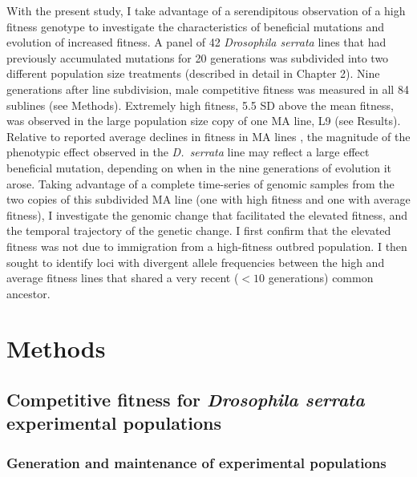 With the present study, I take advantage of a serendipitous observation of a high fitness genotype to investigate the characteristics of beneficial mutations and evolution of increased fitness. A panel of 42 \textit{Drosophila serrata} lines that had previously accumulated mutations for 20 generations was subdivided into two different population size treatments (described in detail in Chapter 2). Nine generations after line subdivision, male competitive fitness was measured in all 84 sublines (see Methods). Extremely high fitness, 5.5 SD above the mean fitness, was observed in the large population size copy of one MA line, L9 (see Results). Relative to reported average declines in fitness in MA lines \citep[0.36\% per generation,][]{Hall09}, the magnitude of the phenotypic effect observed in the \textit{D.~serrata} line may reflect a large effect beneficial mutation, depending on when in the nine generations of evolution it arose. Taking advantage of a complete time-series of genomic samples from the two copies of this subdivided MA line (one with high fitness and one with average fitness), I investigate the genomic change that facilitated the elevated fitness, and the temporal trajectory of the genetic change. I first confirm that the elevated fitness was not due to immigration from a high-fitness outbred population. I then sought to identify loci with divergent allele frequencies between the high and average fitness lines that shared a very recent ($<10$ generations) common ancestor.\par


\section{Methods}
\subsection{Competitive fitness for \textit{Drosophila serrata} experimental populations}
\subsubsection{Generation and maintenance of experimental populations}

